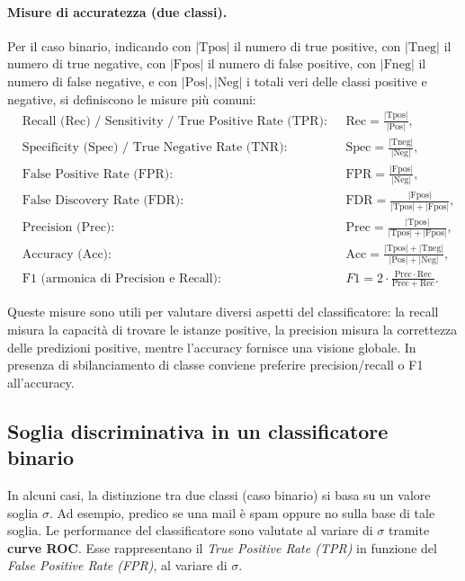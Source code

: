 \paragraph{Misure di accuratezza (due classi).}
Per il caso binario, indicando con $\lvert\mathrm{Tpos}\rvert$ il numero di true positive, con
 $\lvert\mathrm{Tneg}\rvert$ il numero di true negative, con $\lvert\mathrm{Fpos}\rvert$ il numero di false
 positive, con $\lvert\mathrm{Fneg}\rvert$ il numero di false negative, e con $\lvert\mathrm{Pos}\rvert,\lvert\mathrm{Neg}\rvert$ i totali veri delle classi positive e negative, si definiscono le misure
pi\`u comuni:
\begin{align*}
&\text{Recall (Rec) / Sensitivity / True Positive Rate (TPR)}:\quad &&\mathrm{Rec}=\frac{\lvert\mathrm{Tpos}\rvert}{\lvert\mathrm{Pos}\rvert},\\
&\text{Specificity (Spec) / True Negative Rate (TNR)}:\quad &&\mathrm{Spec}=\frac{\lvert\mathrm{Tneg}\rvert}{\lvert\mathrm{Neg}\rvert},\\
&\text{False Positive Rate (FPR)}:\quad &&\mathrm{FPR}=\frac{\lvert\mathrm{Fpos}\rvert}{\lvert\mathrm{Neg}\rvert},\\
&\text{False Discovery Rate (FDR)}:\quad &&\mathrm{FDR}=\frac{\lvert\mathrm{Fpos}\rvert}{\lvert\mathrm{Tpos}\rvert + \lvert\mathrm{Fpos}\rvert},\\
&\text{Precision (Prec)}:\quad &&\mathrm{Prec}=\frac{\lvert\mathrm{Tpos}\rvert}{\lvert\mathrm{Tpos}\rvert + \lvert\mathrm{Fpos}\rvert},\\
&\text{Accuracy (Acc)}:\quad &&\mathrm{Acc}=\frac{\lvert\mathrm{Tpos}\rvert + \lvert\mathrm{Tneg}\rvert}{\lvert\mathrm{Pos}\rvert + \lvert\mathrm{Neg}\rvert},\\
&\text{F1 (armonica di Precision e Recall)}:\quad &&F1 = 2\cdot\frac{\mathrm{Prec}\cdot\mathrm{Rec}}{\mathrm{Prec}+\mathrm{Rec}}.
\end{align*}

Queste misure sono utili per valutare diversi aspetti del classificatore: la recall misura la capacit\`a di trovare
le istanze positive, la precision misura la correttezza delle predizioni positive, mentre l'accuracy fornisce una
visione globale. In presenza di sbilanciamento di classe conviene preferire precision/recall o F1 all'accuracy.

\subsection{Soglia discriminativa in un classificatore binario}
In alcuni casi, la distinzione tra due classi (caso binario) si basa su un valore soglia $\sigma$. Ad esempio, predico se una mail è spam oppure no sulla base di tale soglia. Le performance del classificatore sono valutate al variare di $\sigma$ tramite \textbf{curve ROC}. Esse rappresentano il \emph{True Positive Rate (TPR)} in funzione del \emph{False Positive Rate (FPR)}, al variare di $\sigma$.

